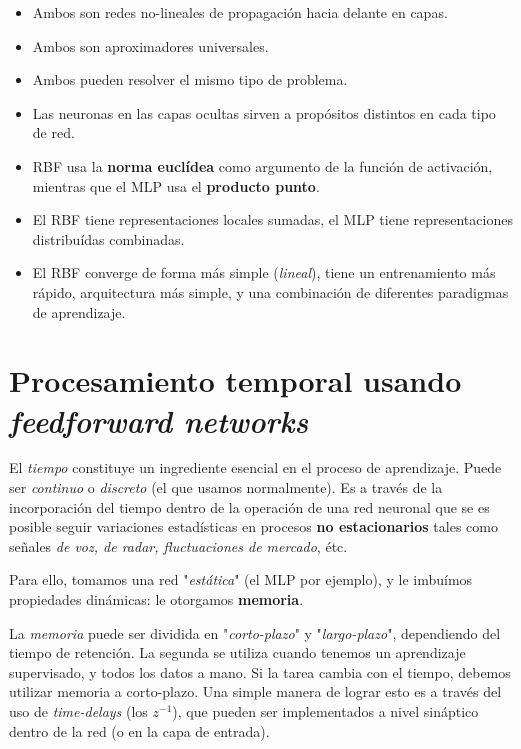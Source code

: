 \documentclass[10pt,a4paper]{article}
\begin{document}
\begin{multicols}{2}
\begin{itemize}
\item Ambos son redes no-lineales de propagación hacia delante en capas.
\item Ambos son aproximadores universales.
\item Ambos pueden resolver el mismo tipo de problema.
\item Las neuronas en las capas ocultas sirven a propósitos distintos en cada tipo de red.
\item RBF usa la \textbf{norma euclídea} como argumento de la función de activación, mientras que el MLP usa el \textbf{producto punto}.
\item El RBF tiene representaciones locales sumadas, el MLP tiene representaciones distribuídas combinadas.
\item El RBF converge de forma más simple (\textit{lineal}), tiene un entrenamiento más rápido, arquitectura más simple, y una combinación de diferentes paradigmas de aprendizaje.
\end{itemize}
\end{multicols}

\section{Procesamiento temporal usando \textit{feedforward networks}}

El \textit{tiempo} constituye un ingrediente esencial en el proceso de aprendizaje. Puede ser \textit{continuo} o \textit{discreto} (el que usamos normalmente). Es a través de la incorporación del tiempo dentro de la operación de una red neuronal que se es posible seguir variaciones estadísticas en procesos \textbf{no estacionarios} tales como señales \textit{de voz, de radar, fluctuaciones de mercado}, étc.

Para ello, tomamos una red "\textit{estática}" (el MLP por ejemplo), y le imbuímos propiedades dinámicas: le otorgamos \textbf{memoria}.

La \textit{memoria} puede ser dividida en "\textit{corto-plazo}" y "\textit{largo-plazo}", dependiendo del tiempo de retención. La segunda se utiliza cuando tenemos un aprendizaje supervisado, y todos los datos a mano. Si la tarea cambia con el tiempo, debemos utilizar memoria a corto-plazo. Una simple manera de lograr esto es a través del uso de \textit{time-delays} (los $z^{-1}$), que pueden ser implementados a nivel sináptico dentro de la red (o en la capa de entrada).
\end{document}
